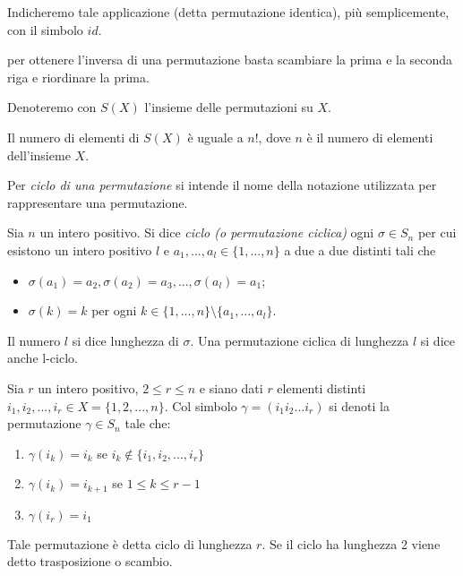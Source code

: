 Indicheremo tale applicazione (detta permutazione identica), più semplicemente, con il simbolo $id$. 

\begin{definizione}
	per ottenere l’inversa di una permutazione basta scambiare la prima e la seconda riga e riordinare la prima. 
\end{definizione}

\begin{definizione}
	Denoteremo con $S(X)$ l'insieme delle permutazioni su $X$. 
\end{definizione}

Il numero di elementi di $S(X)$ è uguale a $n!$, dove $n$ è il numero di elementi dell'insieme $X$.

\begin{definizione}
	Per \textit{ciclo di una permutazione} si intende il nome della notazione utilizzata per rappresentare una permutazione.
\end{definizione}

\begin{definizione}
	Sia $n$ un intero positivo. Si dice \textit{ciclo (o permutazione ciclica)} ogni $\sigma \in S_n$ per cui esistono un intero
	positivo $l$ e $a_1, ..., a_l \in \{1, ..., n\}$ a due a due distinti tali che
	\begin{itemize}
		\item $\sigma(a_1)=a_2, \sigma(a_2)=a_3, ..., \sigma(a_l)=a_1$;
		\item $\sigma(k)=k$ per ogni $k \in \{1, ..., n\} \setminus \{a_1, ..., a_l\}$.
	\end{itemize}
\end{definizione}

Il numero $l$ si dice lunghezza di $\sigma$. Una permutazione ciclica di lunghezza $l$ si dice anche l-ciclo.

\begin{definizione}
	Sia $r$ un intero positivo, $2 \leq r \leq n $ e siano dati $r$ elementi distinti $i_1, i_2, ..., i_r \in X=\{1,2,...,n\}$.
	Col simbolo $\gamma = (i_1 i_2 ... i_r)$ si denoti la permutazione $\gamma \in S_n$ tale che:
	\begin{enumerate}
		\item $\gamma (i_k) = i_k$ se $i_k \notin \{i_1, i_2, ..., i_r\}$
		\item $\gamma(i_k)=i_{k+1}$ se $1 \leq k \leq r-1$
		\item $\gamma (i_r)=i_1$
	\end{enumerate}
\end{definizione}
Tale permutazione è detta ciclo di lunghezza $r$.
Se il ciclo ha lunghezza 2 viene detto trasposizione o scambio.


